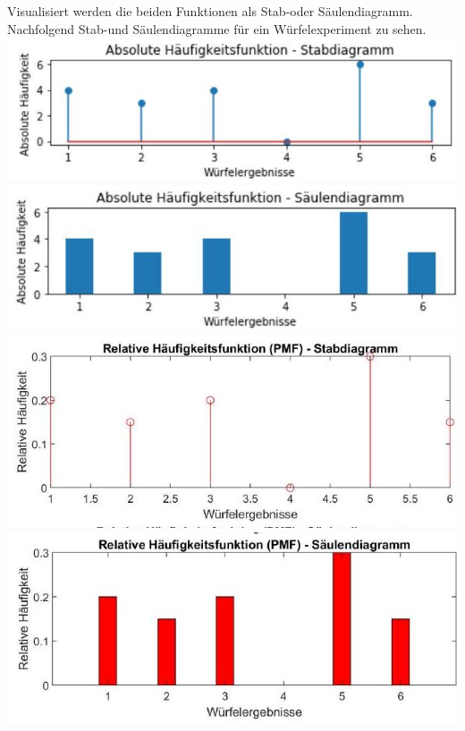 \documentclass[10pt]{article}
\begin{document}
Visualisiert werden die beiden Funktionen als Stab-oder Säulendiagramm. Nachfolgend Stab-und Säulendiagramme für ein Würfelexperiment zu sehen.\\
\includegraphics[width=\linewidth]{images/2025_01_02_7223f4748d9c61c6ce42g-1(1)}\\
\includegraphics[width=\linewidth]{images/2025_01_02_7223f4748d9c61c6ce42g-1}\\
\includegraphics[width=\linewidth]{images/2025_01_02_7223f4748d9c61c6ce42g-2(1)}\\
\includegraphics[width=\linewidth]{images/2025_01_02_7223f4748d9c61c6ce42g-2}
\end{document}
